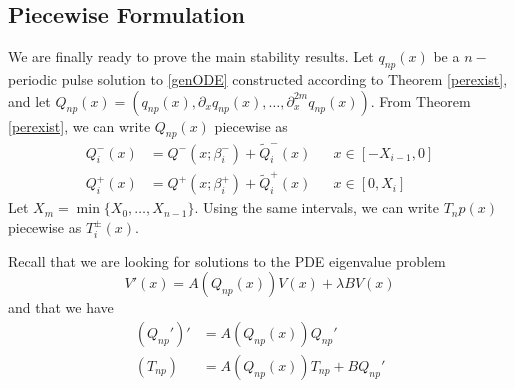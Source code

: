 \documentclass[thesis.tex]{subfiles}
\begin{document}
\subsection{Piecewise Formulation}

We are finally ready to prove the main stability results. Let $q_{np}(x)$ be a $n-$periodic pulse solution to \eqref{genODE} constructed according to Theorem \ref{perexist}, and let $Q_{np}(x) = (q_{np}(x), \partial_x q_{np}(x), \dots, \partial_x^{2m} q_{np}(x) )$. From Theorem \ref{perexist}, we can write $Q_{np}(x)$ piecewise as
\begin{equation}\label{Qnppiece}
\begin{aligned}
Q_i^-(x) &= Q^-(x; \beta_i^-) + \tilde{Q}_i^-(x) && x \in [-X_{i-1}, 0] \\
Q_i^+(x) &= Q^+(x; \beta_i^+) + \tilde{Q}_i^+(x) && x \in [0, X_i]
\end{aligned}
\end{equation}
Let $X_m = \min\{X_0, \dots, X_{n-1}\}$. Using the same intervals, we can write $T_np(x)$ piecewise as $T_i^\pm(x)$. 

Recall that we are looking for solutions to the PDE eigenvalue problem
\begin{equation}\label{PDEeig4}
V'(x) = A(Q_{np}(x))V(x) + \lambda B V(x)
\end{equation}
and that we have
\begin{equation}\label{Arelations}
\begin{aligned}
(Q_{np}')' &= A(Q_{np}(x)) Q_{np}' \\
(T_{np}) &= A(Q_{np}(x)) T_{np} + B Q_{np}' 
\end{aligned}
\end{equation}
\end{document}
